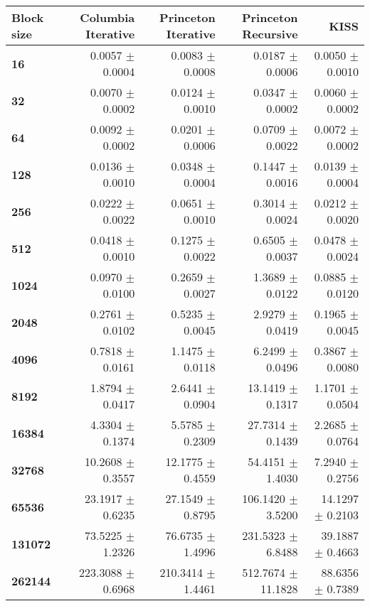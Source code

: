 \begin{tabular}{lrrrr}\toprule
    \textbf{Block size} & \textbf{Columbia Iterative} & \textbf{Princeton Iterative} & \textbf{Princeton Recursive} & \textbf{KISS}\\\midrule
\textbf{16}     & 0.0057 $\pm$ 0.0004   & 0.0083 $\pm$ 0.0008 & 0.0187 $\pm$ 0.0006      & 0.0050 $\pm$ 0.0010  \\
\textbf{32}     & 0.0070 $\pm$ 0.0002   & 0.0124 $\pm$ 0.0010 & 0.0347 $\pm$ 0.0002      & 0.0060 $\pm$ 0.0002  \\
\textbf{64}     & 0.0092 $\pm$ 0.0002   & 0.0201 $\pm$ 0.0006 & 0.0709 $\pm$ 0.0022      & 0.0072 $\pm$ 0.0002  \\
\textbf{128}    & 0.0136 $\pm$ 0.0010   & 0.0348 $\pm$ 0.0004 & 0.1447 $\pm$ 0.0016      & 0.0139 $\pm$ 0.0004  \\
\textbf{256}    & 0.0222 $\pm$ 0.0022   & 0.0651 $\pm$ 0.0010 & 0.3014 $\pm$ 0.0024      & 0.0212 $\pm$ 0.0020  \\
\textbf{512}    & 0.0418 $\pm$ 0.0010   & 0.1275 $\pm$ 0.0022 & 0.6505 $\pm$ 0.0037      & 0.0478 $\pm$ 0.0024  \\
\textbf{1024}   & 0.0970 $\pm$ 0.0100   & 0.2659 $\pm$ 0.0027 & 1.3689 $\pm$ 0.0122      & 0.0885 $\pm$ 0.0120  \\
\textbf{2048}   & 0.2761 $\pm$ 0.0102   & 0.5235 $\pm$ 0.0045 & 2.9279 $\pm$ 0.0419      & 0.1965 $\pm$ 0.0045  \\
\textbf{4096}   & 0.7818 $\pm$ 0.0161   & 1.1475 $\pm$ 0.0118 & 6.2499 $\pm$ 0.0496      & 0.3867 $\pm$ 0.0080  \\
\textbf{8192}   & 1.8794 $\pm$ 0.0417   & 2.6441 $\pm$ 0.0904 & 13.1419 $\pm$ 0.1317     & 1.1701 $\pm$ 0.0504  \\
\textbf{16384}  & 4.3304 $\pm$ 0.1374   & 5.5785 $\pm$ 0.2309 & 27.7314 $\pm$ 0.1439     & 2.2685 $\pm$ 0.0764  \\
\textbf{32768}  & 10.2608 $\pm$ 0.3557  & 12.1775 $\pm$ 0.4559 & 54.4151 $\pm$ 1.4030    & 7.2940 $\pm$ 0.2756  \\
\textbf{65536}  & 23.1917 $\pm$ 0.6235  & 27.1549 $\pm$ 0.8795 & 106.1420 $\pm$ 3.5200   & 14.1297 $\pm$ 0.2103 \\
\textbf{131072} & 73.5225 $\pm$ 1.2326  & 76.6735 $\pm$ 1.4996 & 231.5323 $\pm$ 6.8488   & 39.1887 $\pm$ 0.4663 \\
\textbf{262144} & 223.3088 $\pm$ 0.6968 & 210.3414 $\pm$ 1.4461 & 512.7674 $\pm$ 11.1828 & 88.6356 $\pm$ 0.7389 \\
\bottomrule
\end{tabular}
